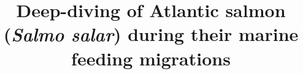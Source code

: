 %
%
%
%
%
%
\RequirePackage{fix-cm}
%
\documentclass[smallextended,referee]{svjour3}       %
%
\smartqed  %
%
\usepackage{graphicx}
%
%
\usepackage{natbib}
\usepackage{multirow}
\usepackage{float}
\usepackage[utf8]{inputenc}
\usepackage[T1, OT1]{fontenc}
%
%
%


\title{Deep-diving of Atlantic salmon (\textit{Salmo salar})  during their marine feeding migrations}


